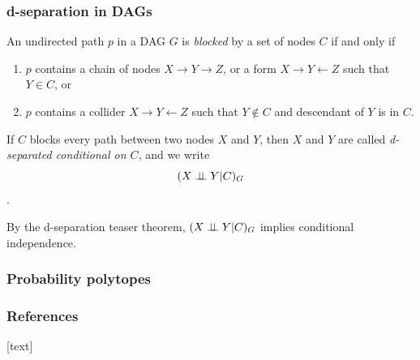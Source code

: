 \begin{frame}
\frametitle{d-separation in DAGs}
\begin{definition}
An undirected path $p$ in a DAG $G$ is \emph{blocked} by a set of nodes $C$ if and only if
\begin{enumerate}
\item $p$ contains a chain of nodes $X \to Y \to Z$, or a form $X \rightarrow Y \leftarrow Z$ such that $Y \in C$, or
\item $p$ contains a collider $X \to Y \leftarrow Z$ such that $Y \notin C$ and descendant of $Y$ is in $C$.
\end{enumerate}
\end{definition}

\begin{definition}
If $C$ blocks every path between two nodes $X$ and $Y$, then $X$ and $Y$ are called \emph{d-separated conditional on $C$}, and we write 
$$(X \perp\!\!\!\perp Y | C)_{G}$$.
\end{definition}

By the d-separation teaser theorem, $(X \perp\!\!\!\perp Y | C)_{G}$ implies conditional independence.\newline
\end{frame}



\begin{frame}
\frametitle{Probability polytopes}
\end{frame}

\begin{frame}[allowframebreaks]
    \frametitle{References}
    [text]
    
    
\end{frame}

